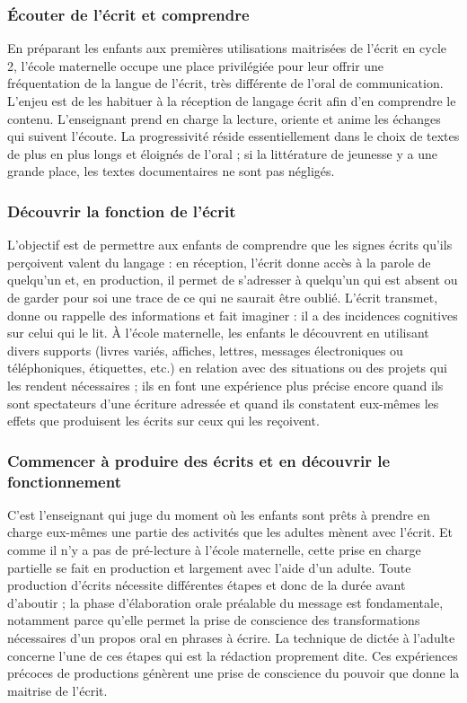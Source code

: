 \subsubsection{Écouter de l’écrit et comprendre}
En préparant les enfants aux premières utilisations maitrisées de l’écrit en cycle 2, l’école maternelle occupe une place privilégiée pour leur offrir une fréquentation de la langue de l’écrit, très différente de l’oral de communication. L’enjeu est de les habituer à la réception de langage écrit afin d’en comprendre le contenu. L’enseignant prend en charge la lecture, oriente et anime les échanges qui suivent l’écoute. La progressivité réside essentiellement dans le choix de textes de plus en plus longs et éloignés de l’oral ; si la littérature de jeunesse y a une grande place, les textes documentaires ne sont pas négligés.

\subsubsection{Découvrir la fonction de l’écrit}
L’objectif est de permettre aux enfants de comprendre que les signes écrits qu’ils perçoivent valent du langage : en réception, l’écrit donne accès à la parole de quelqu’un et, en production, il permet de s’adresser à quelqu’un qui est absent ou de garder pour soi une trace de ce qui ne saurait être oublié. L’écrit transmet, donne ou rappelle des informations et fait imaginer : il a des incidences cognitives sur celui qui le lit. À l’école maternelle, les enfants le découvrent en utilisant divers supports (livres variés, affiches, lettres, messages électroniques ou téléphoniques, étiquettes, etc.) en relation avec des situations ou des projets qui les rendent nécessaires ; ils en font une expérience plus précise encore quand ils sont spectateurs d’une écriture adressée et quand ils constatent eux-mêmes les effets que produisent les écrits sur ceux qui les reçoivent. 

\subsubsection{Commencer à produire des écrits et en découvrir le fonctionnement}
C’est l’enseignant qui juge du moment où les enfants sont prêts à prendre en charge eux-mêmes une partie des activités que les adultes mènent avec l’écrit. Et comme il n’y a pas de pré-lecture à l’école maternelle, cette prise en charge partielle se fait en production et largement avec l’aide d’un adulte. Toute production d’écrits nécessite différentes étapes et donc de la durée avant d’aboutir ; la phase d’élaboration orale préalable du message est fondamentale, notamment parce qu’elle permet la prise de conscience des transformations nécessaires d’un propos oral en phrases à écrire. La technique de dictée à l’adulte concerne l’une de ces étapes qui est la rédaction proprement dite. Ces expériences précoces de productions génèrent une prise de conscience du pouvoir que donne la maitrise de l’écrit.

